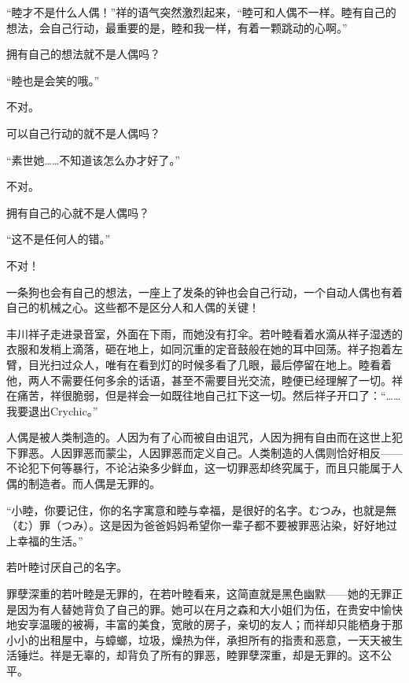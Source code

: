 \documentclass{article}
\begin{document}
“睦才不是什么人偶！”祥的语气突然激烈起来，“睦可和人偶不一样。睦有自己的想法，会自己行动，最重要的是，睦和我一样，有着一颗跳动的心啊。”



拥有自己的想法就不是人偶吗？



“睦也是会笑的哦。”



不对。



可以自己行动的就不是人偶吗？



“素世她……不知道该怎么办才好了。”



不对。



拥有自己的心就不是人偶吗？



“这不是任何人的错。”



不对！



一条狗也会有自己的想法，一座上了发条的钟也会自己行动，一个自动人偶也有着自己的机械之心。这些都不是区分人和人偶的关键！



丰川祥子走进录音室，外面在下雨，而她没有打伞。若叶睦看着水滴从祥子湿透的衣服和发梢上滴落，砸在地上，如同沉重的定音鼓般在她的耳中回荡。祥子抱着左臂，目光扫过众人，唯有在看到灯的时候多看了几眼，最后停留在地上。睦看着他，两人不需要任何多余的话语，甚至不需要目光交流，睦便已经理解了一切。祥在痛苦，祥很脆弱，但是祥会一如既往地自己扛下这一切。然后祥子开口了：“……我要退出Crychic。”



人偶是被人类制造的。人因为有了心而被自由诅咒，人因为拥有自由而在这世上犯下罪恶。人因罪恶而蒙尘，人因罪恶而定义自己。人类制造的人偶则恰好相反——不论犯下何等暴行，不论沾染多少鲜血，这一切罪恶却终究属于，而且只能属于人偶的制造者。而人偶是无罪的。



“小睦，你要记住，你的名字寓意和睦与幸福，是很好的名字。むつみ，也就是無（む）罪（つみ）。这是因为爸爸妈妈希望你一辈子都不要被罪恶沾染，好好地过上幸福的生活。”



若叶睦讨厌自己的名字。



罪孽深重的若叶睦是无罪的，在若叶睦看来，这简直就是黑色幽默——她的无罪正是因为有人替她背负了自己的罪。她可以在月之森和大小姐们为伍，在贵安中愉快地安享温暖的被褥，丰富的美食，宽敞的房子，亲切的友人；而祥却只能栖身于那小小的出租屋中，与蟑螂，垃圾，燥热为伴，承担所有的指责和恶意，一天天被生活锤烂。祥是无辜的，却背负了所有的罪恶，睦罪孽深重，却是无罪的。这不公平。
\end{document}
